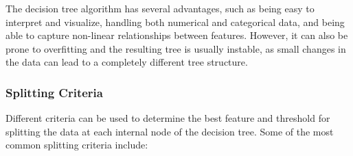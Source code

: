 The decision tree algorithm has several advantages, such as being easy to interpret and visualize, handling both numerical and categorical data, and being able to capture non-linear relationships between features. However, it can also be prone to overfitting and the resulting tree is usually instable, as small changes in the data can lead to a completely different tree structure.

\subsubsection{Splitting Criteria}

Different criteria can be used to determine the best feature and threshold for splitting the data at each internal node of the decision tree. Some of the most common splitting criteria include:


